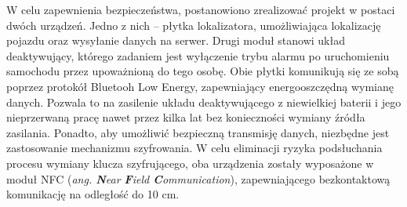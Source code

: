 W celu zapewnienia bezpieczeństwa, postanowiono zrealizować projekt w postaci dwóch urządzeń. Jedno z nich – płytka lokalizatora, umożliwiająca lokalizację pojazdu oraz wysyłanie danych na serwer. Drugi moduł stanowi układ deaktywujący, którego zadaniem jest wyłączenie trybu alarmu po uruchomieniu samochodu przez upoważnioną do tego osobę. Obie płytki komunikują się ze sobą poprzez protokół Bluetooh Low Energy, zapewniający energooszczędną wymianę danych. Pozwala to na zasilenie układu deaktywującego z niewielkiej baterii i jego nieprzerwaną pracę nawet przez kilka lat bez konieczności wymiany źródła zasilania. 
Ponadto, aby umożliwić  bezpieczną transmisję danych, niezbędne jest zastosowanie mechanizmu szyfrowania. W celu eliminacji ryzyka podsłuchania procesu wymiany klucza szyfrującego, oba urządzenia zostały wyposażone w moduł NFC (\textit{ang. \textbf{N}ear \textbf{F}ield \textbf{C}ommunication}), zapewniającego bezkontaktową komunikację na odległość do 10 cm.